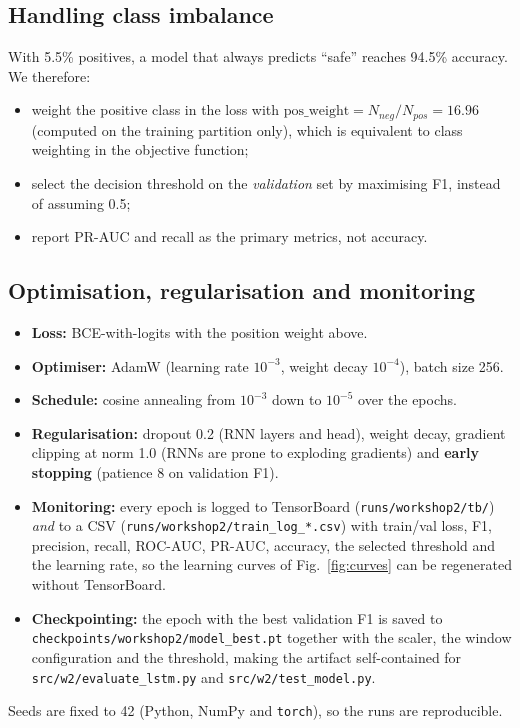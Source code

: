 \documentclass[conference]{IEEEtran}
\begin{document}
\subsection{Handling class imbalance}
With 5.5\% positives, a model that always predicts ``safe'' reaches 94.5\%
accuracy. We therefore:
\begin{itemize}
\item weight the positive class in the loss with
      $\text{pos\_weight} = N_{neg}/N_{pos} = 16.96$ (computed on the
      training partition only), which is equivalent to class weighting in the
      objective function;
\item select the decision threshold on the \emph{validation} set by maximising
      F1, instead of assuming 0.5;
\item report PR-AUC and recall as the primary metrics, not accuracy.
\end{itemize}

\subsection{Optimisation, regularisation and monitoring}
\begin{itemize}
\item \textbf{Loss:} BCE-with-logits with the position weight above.
\item \textbf{Optimiser:} AdamW (learning rate $10^{-3}$, weight decay
      $10^{-4}$), batch size 256.
\item \textbf{Schedule:} cosine annealing from $10^{-3}$ down to
      $10^{-5}$ over the epochs.
\item \textbf{Regularisation:} dropout 0.2 (RNN layers and head), weight
      decay, gradient clipping at norm 1.0 (RNNs are prone to exploding
      gradients) and \textbf{early stopping} (patience 8 on validation F1).
\item \textbf{Monitoring:} every epoch is logged to TensorBoard
      (\texttt{runs/workshop2/tb/}) \emph{and} to a CSV (\texttt{runs/workshop2/train\_log\_*.csv})
      with train/val loss, F1, precision, recall, ROC-AUC, PR-AUC, accuracy,
      the selected threshold and the learning rate, so the learning curves of
      Fig.~\ref{fig:curves} can be regenerated without TensorBoard.
\item \textbf{Checkpointing:} the epoch with the best validation F1 is saved
      to \texttt{checkpoints/workshop2/model\_best.pt} together with the scaler, the
      window configuration and the threshold, making the artifact
      self-contained for \texttt{src/w2/evaluate\_lstm.py} and
      \texttt{src/w2/test\_model.py}.
\end{itemize}
Seeds are fixed to 42 (Python, NumPy and \texttt{torch}), so the runs are
reproducible.
\end{document}

